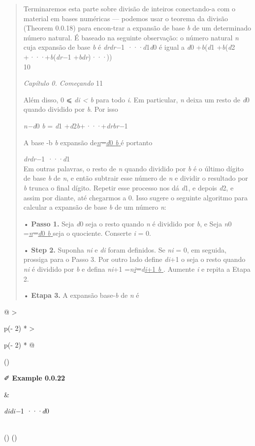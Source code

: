 \documentclass[
]{article}
\begin{document}
\begin{quote}
Terminaremos esta parte sobre divisão de inteiros conectando-a com o
material em bases numéricas --- podemos usar o teorema da divisão
(Theorem 0.0.18) para encon-trar a expansão de base \emph{b} de um
determinado número natural. É baseado na seguinte observação: o número
natural \emph{n} cuja expansão de base \emph{b} é \emph{drdr−}1
\emph{···d}1\emph{d}0 é igual a \emph{d}0 +\emph{b}(\emph{d}1
+\emph{b}(\emph{d}2 +\emph{···}+\emph{b}(\emph{dr−}1
+\emph{bdr})\emph{···}))\\
10

\emph{Capítulo 0. Começando} 11

Além disso, 0 ⩽ \emph{di \textless{} b} para todo \emph{i}. Em
particular, \emph{n} deixa um resto de \emph{d}0 quando dividido por
\emph{b}. Por isso

\emph{n−d}0 \emph{b} = \emph{d}1
+\emph{d}2\emph{b}+\emph{···}+\emph{drbr−}1

A base -b \emph{b} expansão de\emph{\uline{n}\sout{−}\uline{d}}\uline{0
\emph{b }} é portanto

\emph{drdr−}1 \emph{···d}1\\
Em outras palavras, o resto de \emph{n} quando dividido por \emph{b} é o
último dígito de base \emph{b} de \emph{n}, e então subtrair esse número
de \emph{n} e dividir o resultado por \emph{b} trunca o final dígito.
Repetir esse processo nos dá \emph{d}1, e depois \emph{d}2, e assim por
diante, até chegarmos a 0. Isso sugere o seguinte algoritmo para
calcular a expansão de base \emph{b} de um número \emph{n}:

• \textbf{Passo 1.} Seja \emph{d}0 seja o resto quando \emph{n} é
dividido por \emph{b}, e Seja \emph{n}0
=\emph{\uline{n}\sout{−}\uline{d}}\uline{0 \emph{b }} seja o quociente.
Conserte \emph{i} = 0.

• \textbf{Step 2.} Suponha \emph{ni} e \emph{di} foram definidos. Se
\emph{ni} = 0, em seguida, prossiga para o Passo 3. Por outro lado
define \emph{di}+1 o seja o resto quando \emph{ni} é dividido por
\emph{b} e defina \emph{ni}+1
=\emph{n\uline{i}\sout{−}d\uline{i}}\uline{+1 \emph{b }} . Aumente
\emph{i} e repita a Etapa 2.

• \textbf{Etapa 3.} A expansão base-\emph{b} de \emph{n} é
\end{quote}

\begin{longtable}[]{@{}
  >{\raggedright\arraybackslash}p{(\columnwidth - 2\tabcolsep) * }
  >{\raggedright\arraybackslash}p{(\columnwidth - 2\tabcolsep) * }@{}}
\toprule()
\begin{minipage}[b]{\linewidth}\raggedright
✐ \textbf{Example 0.0.22}
\end{minipage} & \begin{minipage}[b]{\linewidth}\raggedright
\emph{didi−}1 \emph{···d}0
\end{minipage} \\
\midrule()
\endhead
\bottomrule()
\end{longtable}
\end{document}
